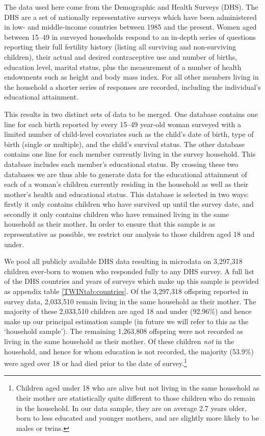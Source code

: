 The data used here come from the Demographic and Health Surveys (DHS).  The DHS 
are a set of nationally representative surveys which have been administered in 
low- and middle-income countries between 1985 and the present.  Women aged 
between 15--49 in surveyed households respond to an in-depth series of questions 
reporting their full fertility history (listing all surviving and non-surviving 
children), their actual and desired contraceptive use and number of births, 
education level, marital status, plus the measurement of a number of health 
endowments such as height and body mass index.  For all other members living in 
the household a shorter series of responses are recorded, including the 
individual's educational attainment.

This results in two distinct sets of data to be merged.  One database contains
one line for each birth reported by every 15--49 year-old woman surveyed with
a limited number of child-level covariates such as the child's date of birth,
type of birth (single or multiple), and the child's survival status.  The other
database contains one line for each member currently living in the survey 
household.  This database includes each member's educational status.  By 
crossing these two databases we are thus able to generate data for the
educational attainment of each of a woman's children currently residing in the 
household as well as their mother's health and educational status.  This 
database is selected in two ways: firstly it only contains children who have 
survived up until the survey date, and secondly it only contains children who 
have remained living in the same household as their mother.  In order to ensure 
that this sample is as representative as possible, we restrict our analysis to 
those children aged 18 and under.

We pool all publicly available DHS data resulting in microdata on 3,297,318
children ever-born to women who responded fully to any DHS survey.  A full list 
of the DHS countries and years of surveys which make up this sample is provided 
as appendix table \ref{TWINtab:countries}.  Of the 3,297,318 offspring reported in 
survey data, 2,033,510 remain living in the same household as their mother.  The 
majority of these 2,033,510 children are aged 18 and under (92.96\%) and hence make 
up our principal estimation sample (in future we will refer to this as the 
`household sample').  The remaining 1,263,808 offspring were not recorded as 
living in the same household as their mother.  Of these children \emph{not} in the 
household, and hence for whom education is not recorded, the majority (53.9\%) were 
aged over 18 or had died prior to the date of survey.\footnote{Children aged under 
18 who are alive but not living in the same household as their mother are 
statistically quite different to those children who do remain in the household.  
In our data sample, they are on average 2.7 years older, born to less educated 
and younger mothers, and are slightly more likely to be males or twins.}

